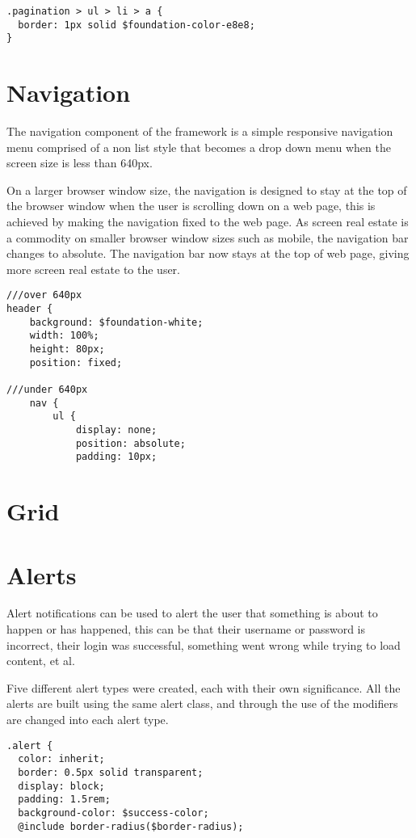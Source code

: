 \begin{lstlisting}[language=CSS3]
.pagination > ul > li > a {
  border: 1px solid $foundation-color-e8e8;
}
\end{lstlisting}

\section*{Navigation}
The navigation component of the framework is a simple responsive navigation menu  comprised of a non list style that becomes a drop down menu when the screen size is less than 640px.

On a larger browser window size, the navigation is designed to stay at the top of the browser window when the user is scrolling down on a web page, this is achieved by making the navigation fixed to the web page. As screen real estate is a commodity on smaller browser window sizes such as mobile, the navigation bar changes to absolute. The navigation bar now stays at the top of web page, giving more screen real estate to the user. 

\begin{lstlisting}[language=CSS3]
///over 640px
header {
	background: $foundation-white;
	width: 100%;
	height: 80px;
	position: fixed; 
	
///under 640px			
	nav {
		ul {
			display: none;
			position: absolute;
			padding: 10px;
\end{lstlisting}
\section*{Grid}

\section*{Alerts}
Alert notifications can be used to alert the user that something is about to happen or has happened, this can be that their username or password is incorrect, their login was successful, something went wrong while trying to load content, et al.

Five different alert types were created, each with their own significance. All the alerts are built using the same alert class, and through the use of the modifiers are changed into each alert type. 

\begin{lstlisting}[language=CSS3]
.alert {
  color: inherit;
  border: 0.5px solid transparent;
  display: block;
  padding: 1.5rem;
  background-color: $success-color;
  @include border-radius($border-radius);
\end{lstlisting}

